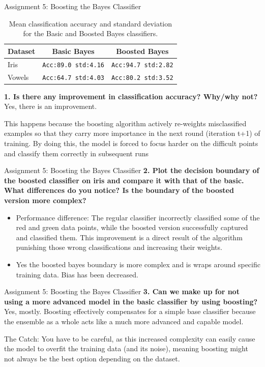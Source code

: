 \documentclass[10pt]{beamer}
\begin{document}
\begin{frame}{Assignment 5: Boosting the Bayes Classifier}
\begin{table}[h!]
    \centering
    \begin{tabular}{|l|c|c|}
        \hline
        \textbf{Dataset} & \textbf{Basic Bayes} & \textbf{Boosted Bayes} \\ 
        \hline
        Iris & \texttt{Acc:89.0 std:4.16} & \texttt{Acc:94.7 std:2.82} \\ 
        \hline
        Vowels & \texttt{Acc:64.7 std:4.03} & \texttt{Acc:80.2  std:3.52} \\ 
        \hline
    \end{tabular}
    \vspace{0.2cm}
    \caption{Mean classification accuracy and standard deviation for the Basic and Boosted Bayes classifiers.}
    \label{tab:bayes_results}
\end{table}
    \textbf{1. Is there any improvement in classification accuracy? Why/why not?} \\

Yes, there is an improvement. 

This happens because the boosting algorithm actively re-weights misclassified examples 
so that they carry more importance in the next round (iteration t+1) of training. 
By doing this, the model is forced to focus harder on the difficult points and classify them correctly in subsequent runs
\end{frame}
\begin{frame}{Assignment 5: Boosting the Bayes Classifier}
    \textbf{2. Plot the decision boundary of the boosted classifier on iris and
compare it with that of the basic. What differences do you notice?
Is the boundary of the boosted version more complex?} 
\begin{itemize}
    \item Performance difference: The regular classifier incorrectly 
        classified some of the red and green data points, while the boosted version 
        successfully captured and classified them. This improvement is a direct result of the algorithm punishing those wrong classifications 
and increasing their weights.

    \item Yes the boosted bayes boundary is more complex and is wraps around specific training data. Bias has been decreased.
\end{itemize}

\end{frame}
\begin{frame}{Assignment 5: Boosting the Bayes Classifier}
\textbf{3. Can we make up for not using a more advanced model in the basic
classifier by using boosting?}
Yes, mostly. Boosting effectively compensates for a simple base classifier because the ensemble as a whole acts like a much more advanced and capable model.

The Catch: You have to be careful, as this increased complexity can easily cause the model to overfit the training data (and its noise), meaning boosting might not always be the best option depending on the dataset.
\end{frame}
\end{document}
